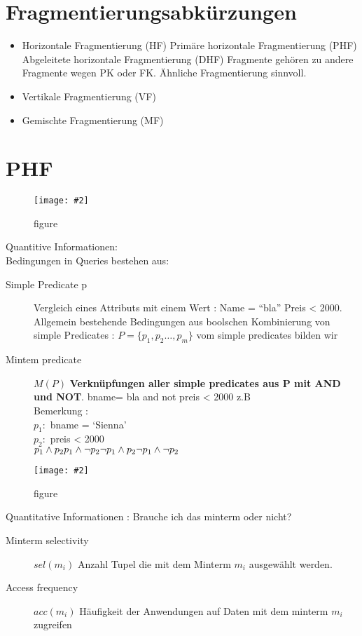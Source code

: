 \documentclass[a4paper,10pt,titlepage=false]{scrreprt}
\newcommand{\pic}[2][figure]{\begin{figure}[h]
 \centering
 \texttt{[image: \#2]}
 \caption{#1}
\end{figure}
}
\begin{document}
\section{Fragmentierungsabkürzungen}
\begin{itemize}
 \item Horizontale Fragmentierung (HF)
\subitem Primäre horizontale Fragmentierung (PHF)
\subitem Abgeleitete horizontale Fragmentierung (DHF) Fragmente gehören zu andere Fragmente wegen PK oder FK. Ähnliche 
Fragmentierung sinnvoll.
\item Vertikale Fragmentierung (VF)
\item Gemischte Fragmentierung (MF)
\end{itemize}

\section{PHF}
\pic{phfbsp.png}

Quantitive Informationen:\\
Bedingungen in Queries bestehen aus:
\begin{description}
 \item [Simple Predicate p] Vergleich eines Attributs mit einem Wert : Name = ``bla'' Preis < 2000. Allgemein 
bestehende Bedingungen aus boolschen Kombinierung von simple Predicates : $ P = \{p_1,p_2 \ldots , p_m\}$ vom simple 
predicates bilden wir
\item[Mintem predicate] $M(P)$ \textbf{Verknüpfungen aller simple predicates aus P mit AND und NOT}. bname= bla and not 
preis < 2000 z.B \\
Bemerkung : \\
$p_1 : $ bname = `Sienna'\\
$p_2 : $ preis < 2000 \\
$ p_1 \wedge p_2 \\
p_1 \wedge \neg p_2 \\
\neg p_1 \wedge p_2\\
\neg p_1 \wedge \neg p_2$

\end{description}
\pic{mtbsp.png} %
\newpage
Quantitative Informationen : Brauche ich das minterm oder nicht?
\begin{description}
 \item [Minterm selectivity] $sel(m_i)$ Anzahl Tupel die mit dem Minterm $m_i$ ausgewählt werden.
 \item [Access frequency] $acc(m_i)$ Häufigkeit der Anwendungen auf Daten mit dem
minterm $m_i$ zugreifen
\end{description}
\end{document}
